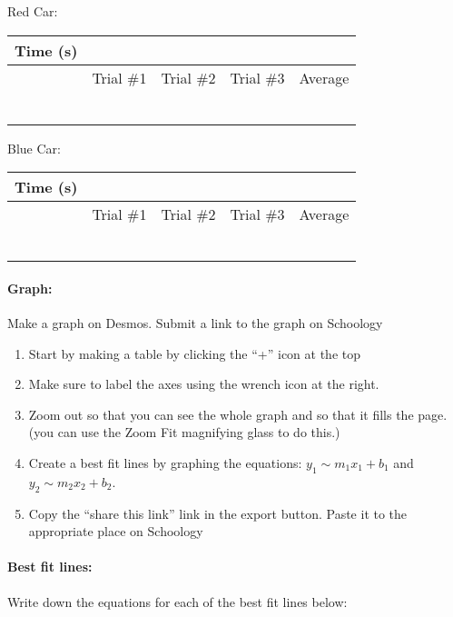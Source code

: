 \documentclass[10pt]{exam}
\begin{document}
  \def\cw{.15\textwidth}
  \newcommand{\datatable}{
    \renewcommand{\arraystretch}{1.65}
    \begin{center}
      \begin{tabular}
        {|*{5}{>{\centering\arraybackslash}m{\cw}|}}
        \hline
        \multirow{2}{\cw}
          {\centering Time (s)} & 
        \multicolumn{4}{c|}{Distance Traveled (m)} \\
        \cline{2-5}
        & Trial \#1 & Trial \#2 & Trial \#3 & Average \\
        \hline
        2 &&&&\\
        \hline
        4 &&&&\\
        \hline
        6 &&&&\\
        \hline
        8 &&&&\\
        \hline
        10 &&&&\\
        \hline
        12 &&&&\\
        \hline
      \end{tabular}
    \end{center}
  }

  Red Car:
  \datatable

  Blue Car:
  \datatable

  \paragraph{Graph:} 
    Make a graph on Desmos.  Submit a link to the graph on Schoology
    
    \begin{enumerate}[label=\alph*),topsep=0pt,itemsep=-1ex,partopsep=1ex,parsep=1ex]
      \item 
        Start by making a table by clicking the “+” icon at the top 
      \item
        Make sure to label the axes using the wrench icon at the right.
      \item
        Zoom out so that you can see the whole graph and so that it fills the page. (you can use the Zoom Fit magnifying glass to do this.)
      \item
        Create a best fit lines by graphing the equations: $y_1 \sim m_1 x_1 + b_1$ and $y_2 \sim m_2 x_2 + b_2$.
      \item
        Copy the “share this link” link in the export button.  Paste it to the appropriate place on Schoology
    \end{enumerate}

  \paragraph{Best fit lines:}
    Write down the equations for each of the best fit lines below:
\end{document}
